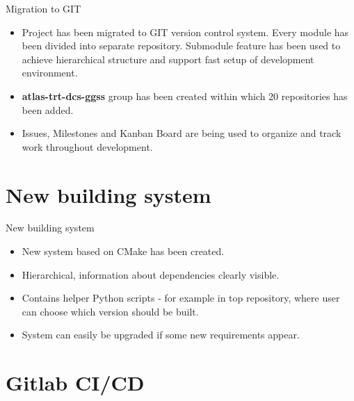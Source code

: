 \documentclass[10pt]{beamer}
\begin{document}
\begin{frame}{Migration to GIT}
\begin{itemize}
	\item Project has been migrated to GIT version control system. Every module has been divided into separate repository. Submodule feature has been used to achieve hierarchical structure and support fast setup of development environment.
	\item \textbf{atlas-trt-dcs-ggss} group has been created within which 20 repositories has been added.
	\item Issues, Milestones and Kanban Board are being used to organize and track work throughout development.
\end{itemize}
\end{frame}


\section {New building system}

\begin{frame}{New building system}
\begin{itemize}
  \item New system based on CMake has been created.
  \item Hierarchical, information about dependencies clearly visible.
  \item Contains helper Python scripts - for example in top repository, where user can choose which version should be built.
  \item System can easily be upgraded if some new requirements appear.
\end{itemize}
\end{frame}


\section {Gitlab CI/CD}
\end{document}
